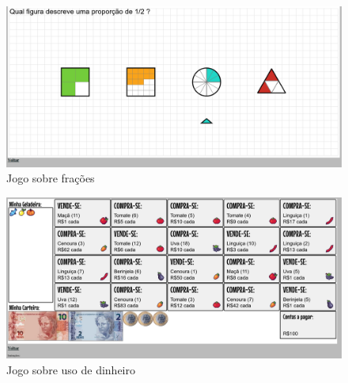 \begin{figure}
\includegraphics[width=\textwidth]{imgs/jogo1}
\caption{Jogo sobre frações}
\end{figure}


\begin{figure}
\includegraphics[width=\textwidth]{imgs/jogo2}
\caption{Jogo sobre uso de dinheiro}
\end{figure}


